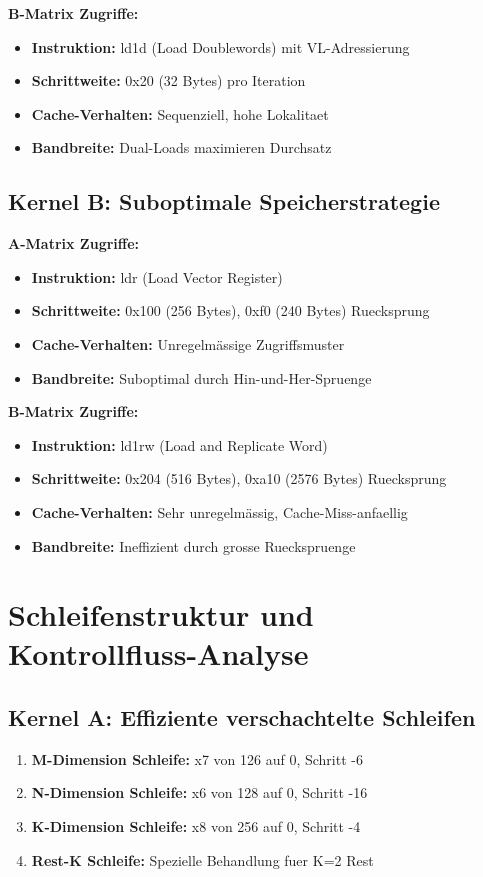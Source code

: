 \documentclass[11pt,a4paper]{article}
\begin{document}
\textbf{B-Matrix Zugriffe:}
\begin{itemize}
\item \textbf{Instruktion:} ld1d (Load Doublewords) mit VL-Adressierung
\item \textbf{Schrittweite:} 0x20 (32 Bytes) pro Iteration
\item \textbf{Cache-Verhalten:} Sequenziell, hohe Lokalitaet
\item \textbf{Bandbreite:} Dual-Loads maximieren Durchsatz
\end{itemize}

\subsection{Kernel B: Suboptimale Speicherstrategie}

\textbf{A-Matrix Zugriffe:}
\begin{itemize}
\item \textbf{Instruktion:} ldr (Load Vector Register)
\item \textbf{Schrittweite:} 0x100 (256 Bytes), 0xf0 (240 Bytes) Ruecksprung
\item \textbf{Cache-Verhalten:} Unregelmässige Zugriffsmuster
\item \textbf{Bandbreite:} Suboptimal durch Hin-und-Her-Spruenge
\end{itemize}

\textbf{B-Matrix Zugriffe:}
\begin{itemize}
\item \textbf{Instruktion:} ld1rw (Load and Replicate Word)
\item \textbf{Schrittweite:} 0x204 (516 Bytes), 0xa10 (2576 Bytes) Ruecksprung
\item \textbf{Cache-Verhalten:} Sehr unregelmässig, Cache-Miss-anfaellig
\item \textbf{Bandbreite:} Ineffizient durch grosse Rueckspruenge
\end{itemize}

\section{Schleifenstruktur und Kontrollfluss-Analyse}

\subsection{Kernel A: Effiziente verschachtelte Schleifen}

\begin{enumerate}
\item \textbf{M-Dimension Schleife:} x7 von 126 auf 0, Schritt -6
\item \textbf{N-Dimension Schleife:} x6 von 128 auf 0, Schritt -16  
\item \textbf{K-Dimension Schleife:} x8 von 256 auf 0, Schritt -4
\item \textbf{Rest-K Schleife:} Spezielle Behandlung fuer K=2 Rest
\end{enumerate}
\end{document}
